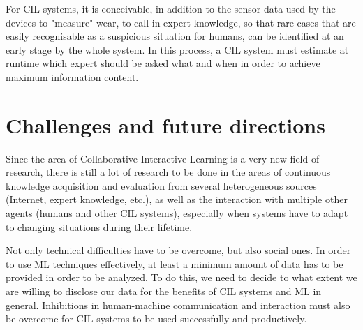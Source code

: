 \documentclass[conference]{IEEEtran}
\begin{document}
For CIL-systems, it is conceivable, in addition to the sensor data used by the devices to "measure" wear, to call in expert knowledge, so that rare cases that are easily recognisable as a suspicious situation for humans, can be identified at an early stage by the whole system.
In this process, a CIL system must estimate at runtime which expert should be asked what and when in order 
to achieve maximum information content.

\section{Challenges and future directions}
Since the area of Collaborative Interactive Learning is a very new field of research, there is still a lot of 
research to be done in the areas of continuous knowledge acquisition 
and evaluation from several heterogeneous sources (Internet, expert knowledge, etc.), 
as well as the interaction with multiple other agents (humans and other CIL systems), 
especially when systems have to adapt to changing situations during their lifetime.

Not only technical difficulties have to be overcome, but also social ones. In order to use ML techniques effectively, 
at least a minimum amount of data has to be provided in order to be analyzed. To do this, we need to decide 
to what extent we are willing to disclose our data for the benefits of CIL systems and ML in general.
Inhibitions in human-machine communication and interaction must also be overcome for CIL systems to be used 
successfully and productively.
\end{document}
